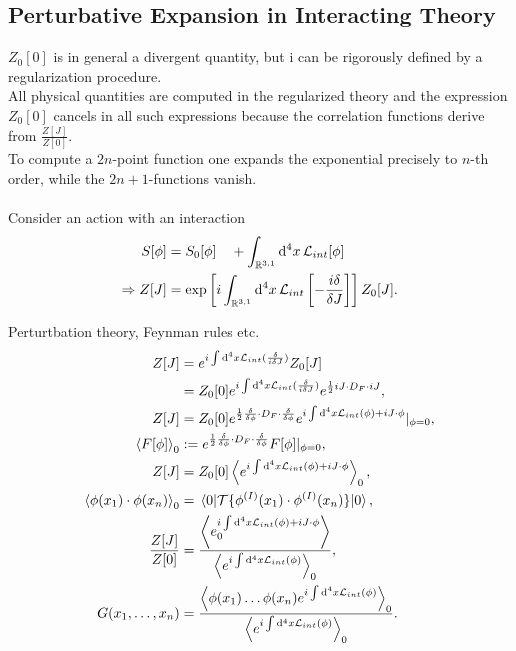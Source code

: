 \subsection{Perturbative Expansion in Interacting Theory}
$Z_0[0]$ is in general a divergent quantity, but i can be rigorously defined by a regularization procedure.\\
All physical quantities are computed in the regularized theory and the expression $Z_0[0]$ cancels in all such expressions because the correlation functions derive from $\frac{Z[J]}{Z[0]}$.\\
To compute a $2n$-point function one expands the exponential precisely to $n$-th order, while the $2n+1$-functions vanish.\\
\\
Consider an action with an interaction
\begin{align}
	S[\phi] &= S_0 [\phi] \quad + \int_{\mathbb{R}^{3,1}} \mathrm{d}^4 x \, \mathcal{L}_{int} [\phi] \\
	\Rightarrow Z[J] &= \exp\left[i \int_{\mathbb{R}^{3,1}} \mathrm{d}^4 x \, \mathcal{L}_{int} \left[- \frac{i \delta}{\delta J} \right]   \right] Z_0[J].
\end{align}
\begin{mybox}{Perturtbation theory, Feynman rules etc.}
	\begin{subequations}
		\begin{align}
				Z[J] &= e^{i \int \mathrm{d}^4 x \mathcal{L}_{int} (\frac{\delta}{i \delta J} ) } Z_0[J] \\
				&= Z_0[0] e^{i \int \mathrm{d}^4 x \mathcal{L}_{int} (\frac{\delta}{i\delta J} ) } e^{\frac{1}{2} i J\cdot D_F \cdot i J},\nonumber \\
						Z[J] &= Z_0[0] e^{\frac{1}{2} \frac{\delta}{\delta \phi} \cdot D_F \cdot \frac{\delta}{\delta \phi}} e^{i \int \mathrm{d}^4 x \mathcal{L}_{int} (\phi)+ i J\cdot \phi} |_{\phi=0},\\
						\expval{F[\phi]}_0 &:= e^{\frac{1}{2} \frac{\delta}{\delta \phi} \cdot D_F \cdot \frac{\delta}{\delta \phi}} F[\phi] |_{\phi=0},\label{eq:wickPIexpval}\\
						Z[J] &= Z_0[0] \expval{e^{i \int \mathrm{d}^4 x \mathcal{L}_{int}(\phi) + i J\cdot \phi}}_0,\\
						\expval{\phi(x_1)\cdot \phi(x_n)}_0 &= \expval{\mathcal{T}\{\phi^{(I)}(x_1)\cdot \phi^{(I)}(x_n)  \}}{0},\\
						\frac{Z[J]}{Z[0]} &= \frac{\expval{e^{i \int \mathrm{d}^4 x \mathcal{L}_{int} (\phi) + i J\cdot \phi}_0}}{\expval{e^{i \int \mathrm{d}^4 x \mathcal{L}_{int } (\phi)}}_0},\\
						G(x_1,\dots,x_n) &= \frac{\expval{\phi(x_1)\dots \phi(x_n) e^{i \int \mathrm{d}^4 x \mathcal{L}_{int} (\phi)}}_0}{\expval{e^{i \int \mathrm{d}^4 x \mathcal{L}_{int}(\phi)}}_0}\label{eq:cumulantsPI}.
		\end{align}
	\end{subequations}
\end{mybox}

